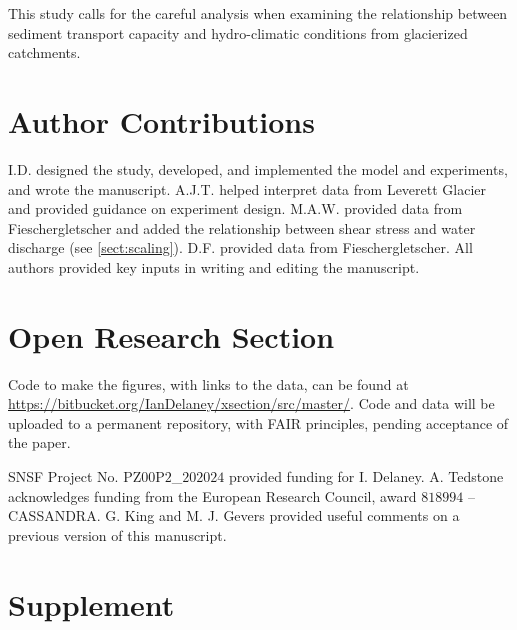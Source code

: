 \documentclass[draft]{agujournal2019}
\begin{document}
This study calls for the careful analysis when examining the relationship between sediment transport capacity and hydro-climatic conditions from glacierized catchments.

\section*{Author Contributions}

I.D. designed the study, developed, and implemented the model and experiments, and wrote the manuscript.
A.J.T. helped interpret data from Leverett Glacier and provided guidance on experiment design.
M.A.W. provided data from Fieschergletscher and added the relationship between shear stress and water discharge (see \ref{sect:scaling}).
D.F. provided data from Fieschergletscher.
All authors provided key inputs in writing and editing the manuscript.


\section*{Open Research Section}

Code to make the figures, with links to the data, can be found at \url{https://bitbucket.org/IanDelaney/xsection/src/master/}.
Code and data will be uploaded to a permanent repository, with FAIR principles, pending acceptance of the paper.

\acknowledgments

SNSF Project No. $\mathrm{PZ00P2}$\_$202024$ provided  funding for I. Delaney.
A. Tedstone acknowledges funding from the European Research Council, award $818994$ -- CASSANDRA.
G. King and M. J. Gevers provided useful comments on a previous version of this manuscript.



\newpage

\section{Supplement}
\end{document}
